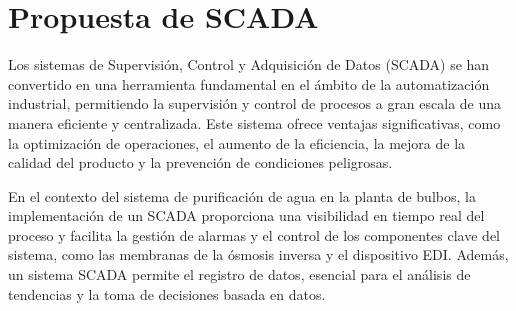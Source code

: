 



\section{Propuesta de SCADA}
\label{sec:scada_proposal}
Los sistemas de Supervisión, Control y Adquisición de Datos (SCADA) se han convertido en
una herramienta fundamental en el ámbito de la automatización industrial, permitiendo
la supervisión y control de procesos a gran escala de una manera eficiente y centralizada.
Este sistema ofrece ventajas significativas, como la optimización de operaciones, el
aumento de la eficiencia, la mejora de la calidad del producto y la prevención de
condiciones peligrosas.

En el contexto del sistema de purificación de agua en la planta de bulbos, la implementación de
un SCADA proporciona una visibilidad en tiempo real del proceso y facilita la
gestión de alarmas y el control de los componentes clave del sistema, como las membranas
de la ósmosis inversa y el dispositivo EDI. Además, un sistema SCADA permite el
registro de datos, esencial para el análisis de tendencias y la toma de decisiones
basada en datos.

